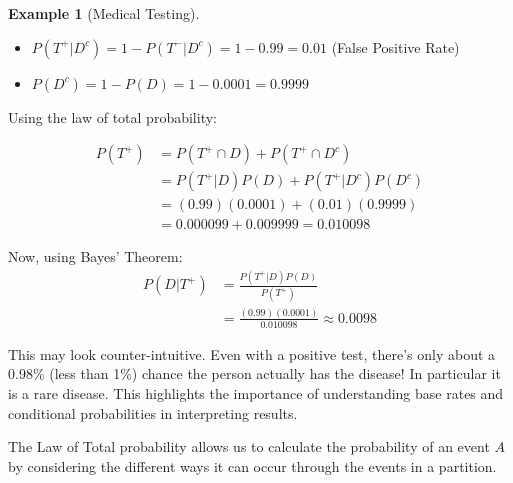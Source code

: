\documentclass[
  letterpaper,
  DIV=11,
  numbers=noendperiod]{scrreport}
\providecommand{\tightlist}{%
  \setlength{\itemsep}{0pt}\setlength{\parskip}{0pt}}
\theoremstyle{definition}
\newtheorem{example}{Example}[chapter]
\theoremstyle{plain}
\theoremstyle{plain}
\theoremstyle{definition}
\theoremstyle{remark}
\begin{document}
\begin{tcolorbox}
\begin{example}[Medical
Testing]
\begin{itemize}
\tightlist
\item
  \(P(T^+|D^c) = 1 - P(T^-|D^c) = 1 - 0.99 = 0.01\) (False Positive
  Rate)
\item
  \(P(D^c) = 1 - P(D) = 1 - 0.0001 = 0.9999\)
\end{itemize}

Using the law of total probability:

\[
\begin{aligned}
P(T^+) &=P(T^+ \cap D)+P(T^+\cap D^c)\\
& =P(T^+|D)P(D) + P(T^+|D^c)P(D^c)\\
&= (0.99)(0.0001) + (0.01)(0.9999)\\
&= 0.000099 + 0.009999 = 0.010098
\end{aligned}
\]

Now, using Bayes' Theorem: \[
\begin{aligned}
P(D|T^+) &= \frac{P(T^+|D) P(D)}{P(T^+)} \\
&=   \frac{(0.99)(0.0001)}{0.010098} \approx 0.0098
\end{aligned}
\]

This may look counter-intuitive. Even with a positive test, there's only
about a 0.98\% (less than 1\%) chance the person actually has the
disease! In particular it is a rare disease. This highlights the
importance of understanding base rates and conditional probabilities in
interpreting results.

\end{example}

\end{tcolorbox}

The Law of Total probability allows us to calculate the probability of
an event \(A\) by considering the different ways it can occur through
the events in a partition.
\end{document}
